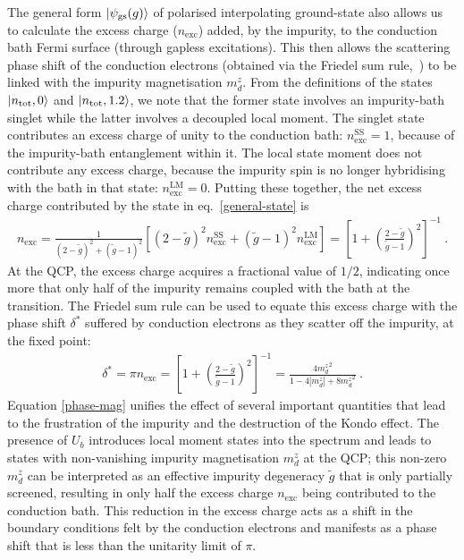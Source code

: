 \documentclass{iopart}
\begin{document}
The general form \(\ket{\psi_\text{gs}(g)}\) of polarised interpolating ground-state also allows us to calculate the excess charge (\(n_\text{exc}\)) added, by the impurity, to the conduction bath Fermi surface (through gapless excitations). This then allows the scattering phase shift of the conduction electrons (obtained via the Friedel sum rule,~\cite{friedel_1956,langer1961friedel,langreth1966}) to be linked with the impurity magnetisation \(m_d^z\). From the definitions of the states \(\ket{n_\text{tot},0}\) and \(\ket{n_\text{tot}, 1.2}\), we note that the former state involves an impurity-bath singlet while the latter involves a decoupled local moment. The singlet state contributes an excess charge of unity to the conduction bath: \(n_\text{exc}^\text{SS} = 1\), because of the impurity-bath entanglement within it. The local state moment does not contribute any excess charge, because the impurity spin is no longer hybridising with the bath in that state: \(n_\text{exc}^\text{LM}=0\). Putting these together, the net excess charge contributed by the state in eq.~\eqref{general-state} is
\begin{eqnarray}
	n_\text{exc} = \frac{1}{(2-\tilde g)^2 + (\tilde g-1)^2}\left[(2-\tilde g)^2 n_\text{exc}^\text{SS} + (\tilde g - 1)^2n_\text{exc}^\text{LM}\right] = \left[1 + \left(\frac{2-\tilde g}{\tilde g-1}\right)^2\right]^{-1}~.
\end{eqnarray}
At the QCP, the excess charge acquires a fractional value of \(1/2\), indicating once more that only half of the impurity remains coupled with the bath at the transition. The Friedel sum rule can be used to equate this excess charge with the phase shift \(\delta^*\) suffered by conduction electrons as they scatter off the impurity, at the fixed point:
\begin{eqnarray}\label{phase-mag}
	\delta^* = \pi n_\text{exc} = \left[1 + \left(\frac{2-\tilde g}{\tilde g-1}\right)^2\right]^{-1} = \frac{4{m_d^z}^2}{1 - 4|m_d^z| + 8{m_d^z}^2}~.
\end{eqnarray}
Equation \eqref{phase-mag} unifies the effect of several important quantities that lead to the frustration of the impurity and the destruction of the Kondo effect. The presence of \(U_b\) introduces local moment states into the spectrum and leads to states with non-vanishing impurity magnetisation \(m_d^z\) at the QCP; this non-zero \(m_d^z\) can be interpreted as an effective impurity degeneracy \(\tilde g\) that is only partially screened, resulting in only half the excess charge \(n_\text{exc}\) being contributed to the conduction bath. This reduction in the excess charge acts as a shift in the boundary conditions felt by the conduction electrons and manifests as a phase shift that is less than the unitarity limit of \(\pi\).
\end{document}
